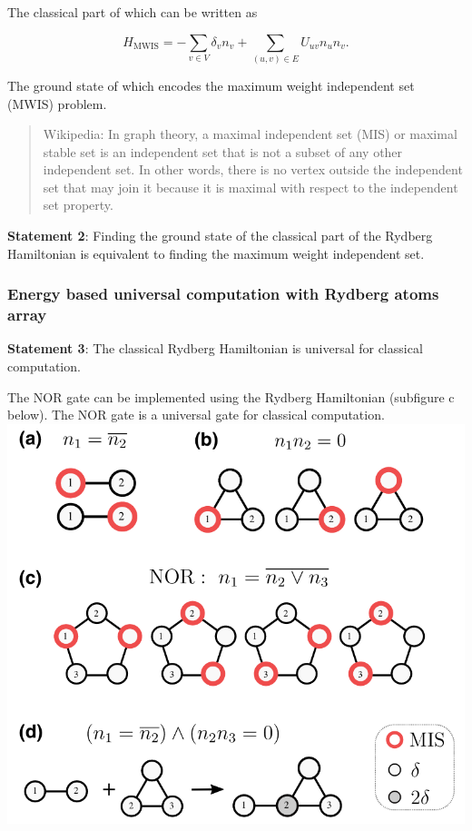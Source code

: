 \documentclass[twocolumn,superscriptaddress,english,showpacs,longbibliography]{revtex4-2}
\begin{document}
The classical part of which can be written as

\begin{equation}
H_{\text{MWIS}} = -\sum_{v \in V}\delta_v n_v + \sum_{(u, v) \in E} U_{uv} n_u n_v.
\end{equation}

The ground state of which encodes the maximum weight independent set
(MWIS) problem.

\begin{quote}
Wikipedia: In graph theory, a maximal independent set (MIS) or maximal
stable set is an independent set that is not a subset of any other
independent set. In other words, there is no vertex outside the
independent set that may join it because it is maximal with respect to
the independent set property.
\end{quote}

\textbf{Statement 2}: Finding the ground state of the classical part of
the Rydberg Hamiltonian is equivalent to finding the maximum weight
independent set.

\subsubsection{Energy based universal computation with Rydberg atoms
array}\label{energy-based-universal-computation-with-rydberg-atoms-array}

\textbf{Statement 3}: The classical Rydberg Hamiltonian is universal for classical computation.

The NOR gate can be implemented using the Rydberg Hamiltonian (subfigure
c below). The NOR gate is a universal gate for classical computation.
\includegraphics[width=\columnwidth]{../notes/images/gadgets.png}
\end{document}
